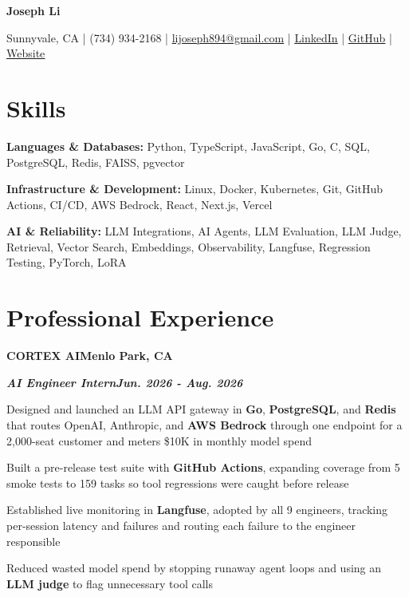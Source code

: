 \documentclass[10pt]{article}
\renewcommand{\resumeheader}[2]{%
  {\centering\fontsize{16}{18}\selectfont\bfseries #1\par}%
  \vspace{4pt}%
  {\centering\fontsize{10.5}{13}\selectfont #2\par}%
  \vspace{6pt}%
}
\renewcommand{\skill}[2]{\textbf{#1:} #2\par\vspace{1.5pt}}
\newcommand{\job}[4]{%
  \vspace{0pt}%
  \textbf{\MakeUppercase{#1}}\hfill\textbf{#2}\par
  \vspace{0.5pt}%
  \textbf{\textit{#3}}\hfill\textbf{\textit{#4}}\par
}
\begin{document}
\resumeheader{Joseph Li}{%
Sunnyvale, CA | (734) 934-2168 | \href{mailto:lijoseph894@gmail.com}{lijoseph894@gmail.com} | \href{https://www.linkedin.com/in/lijoseph894/}{\underline{LinkedIn}} | \href{https://github.com/josephl894}{\underline{GitHub}} | \href{https://josephl894.github.io}{\underline{Website}}}

\section{Skills}
\skill{Languages \& Databases}{Python, TypeScript, JavaScript, Go, C, SQL, PostgreSQL, Redis, FAISS, pgvector}
\skill{Infrastructure \& Development}{Linux, Docker, Kubernetes, Git, GitHub Actions, CI/CD, AWS Bedrock, React, Next.js, Vercel}
\skill{AI \& Reliability}{LLM Integrations, AI Agents, LLM Evaluation, LLM Judge, Retrieval, Vector Search, Embeddings, Observability, Langfuse, Regression Testing, PyTorch, LoRA}

\section{Professional Experience}
\job{Cortex AI}{Menlo Park, CA}{AI Engineer Intern}{Jun. 2026 - Aug. 2026}
\begin{bullets}
  \item Designed and launched an LLM API gateway in \textbf{Go}, \textbf{PostgreSQL}, and \textbf{Redis} that routes OpenAI, Anthropic, and \textbf{AWS Bedrock} through one endpoint for a 2,000-seat customer and meters \$10K in monthly model spend
  \item Built a pre-release test suite with \textbf{GitHub Actions}, expanding coverage from 5 smoke tests to 159 tasks so tool regressions were caught before release
  \item Established live monitoring in \textbf{Langfuse}, adopted by all 9 engineers, tracking per-session latency and failures and routing each failure to the engineer responsible
  \item Reduced wasted model spend by stopping runaway agent loops and using an \textbf{LLM judge} to flag unnecessary tool calls
\end{bullets}
\end{document}
